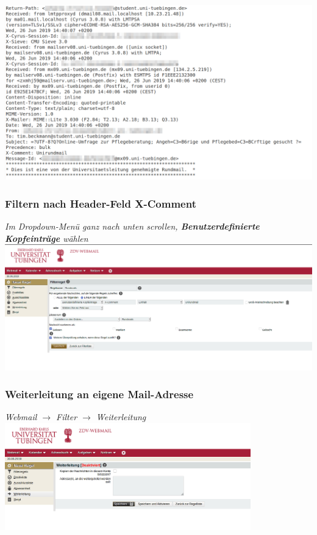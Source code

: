 \documentclass[glossy,aspectratio=169]{beamer}
\begin{document}
	\begin{frame}
	\centering
	\includegraphics[height=0.8\textheight]{pictures/quelltext.png}
	\end{frame}


\begin{frame}
	\frametitle{Filtern nach Header-Feld X-Comment}
	\centering
	\emph{Im Dropdown-Menü ganz nach unten scrollen, \textbf{Benutzerdefinierte Kopfeinträge} wählen}\\
	\includegraphics[width=\textwidth]{pictures/filter_regel.png}
\end{frame}

	\begin{frame}
	\frametitle{Weiterleitung an eigene Mail-Adresse}
	\centering
	\emph{Webmail $\rightarrow$ Filter $\rightarrow$ Weiterleitung}\\
	\includegraphics[width=0.8\textwidth]{pictures/filter_weiterleitung.png}
\end{frame}
\end{document}
